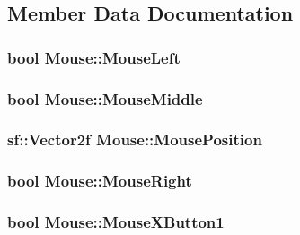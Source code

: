 \subsection{Member Data Documentation}
\hypertarget{class_mouse_ace644d872e798ce789726ec958236428}{
\subsubsection[{Mouse\-Left}]{\setlength{\rightskip}{0pt plus 5cm}bool Mouse\-::\-Mouse\-Left\hspace{0.3cm}{\ttfamily [private]}}}\label{class_mouse_ace644d872e798ce789726ec958236428}
\hypertarget{class_mouse_a4cbf96ff26822cc0eb8ea3f73a9edc9a}{
\subsubsection[{Mouse\-Middle}]{\setlength{\rightskip}{0pt plus 5cm}bool Mouse\-::\-Mouse\-Middle\hspace{0.3cm}{\ttfamily [private]}}}\label{class_mouse_a4cbf96ff26822cc0eb8ea3f73a9edc9a}
\hypertarget{class_mouse_ae83f237e6ca4e0f366eb6f1a03964886}{
\subsubsection[{Mouse\-Position}]{\setlength{\rightskip}{0pt plus 5cm}sf\-::\-Vector2f Mouse\-::\-Mouse\-Position\hspace{0.3cm}{\ttfamily [private]}}}\label{class_mouse_ae83f237e6ca4e0f366eb6f1a03964886}
\hypertarget{class_mouse_a0d7dd53605221594b161f9d8e61aa345}{
\subsubsection[{Mouse\-Right}]{\setlength{\rightskip}{0pt plus 5cm}bool Mouse\-::\-Mouse\-Right\hspace{0.3cm}{\ttfamily [private]}}}\label{class_mouse_a0d7dd53605221594b161f9d8e61aa345}
\hypertarget{class_mouse_af909f12e58b2b80528c5ca05d0452bda}{
\subsubsection[{Mouse\-X\-Button1}]{\setlength{\rightskip}{0pt plus 5cm}bool Mouse\-::\-Mouse\-X\-Button1\hspace{0.3cm}{\ttfamily [private]}}}\label{class_mouse_af909f12e58b2b80528c5ca05d0452bda}
